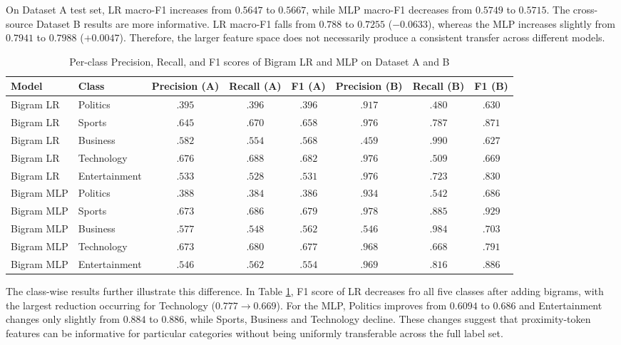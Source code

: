 \documentclass[letterpaper,conference,compsoc,onecolumn]{IEEEtran}
\begin{document}
On Dataset A test set, LR macro-F1 increases from $0.5647$ to $0.5667$, while MLP macro-F1 decreases from $0.5749$ to $0.5715$. The cross-source Dataset B results are more informative. LR macro-F1 falls from $0.788$ to $0.7255$ ($-0.0633$), whereas the MLP increases slightly from $0.7941$ to $0.7988$ ($+0.0047$). Therefore, the larger feature space does not necessarily produce a consistent transfer across different models.

\begin{table}[h]
  \centering
  \caption{Per-class Precision, Recall, and F1 scores of Bigram LR and MLP on Dataset A and B}
  \label{table:lr_mlp_extension_perclass_performance}
  \begin{tabular}{llcccccc}
    \hline
    \textbf{Model} & \textbf{Class} & \textbf{Precision (A)} & \textbf{Recall (A)} & \textbf{F1 (A)} & \textbf{Precision (B)} & \textbf{Recall (B)} & \textbf{F1 (B)} \\
    \hline
    Bigram LR & Politics & $.395$ & $.396$ & $.396$ & $.917$ & $.480$ & $.630$\\
    Bigram LR & Sports & $.645$ & $.670$ & $.658$ & $.976$ & $.787$ & $.871$\\
    Bigram LR & Business & $.582$ & $.554$ & $.568$ & $.459$ & $.990$ & $.627$\\
    Bigram LR & Technology & $.676$ & $.688$ & $.682$ & $.976$ & $.509$ & $.669$\\
    Bigram LR & Entertainment & $.533$ & $.528$ & $.531$ & $.976$ & $.723$ & $.830$\\
    Bigram MLP & Politics & $.388$ & $.384$ & $.386$ & $.934$ & $.542$ & $.686$\\
    Bigram MLP & Sports & $.673$ & $.686$ & $.679$ & $.978$ & $.885$ & $.929$\\
    Bigram MLP & Business & $.577$ & $.548$ & $.562$ & $.546$ & $.984$ & $.703$\\
    Bigram MLP & Technology & $.673$ & $.680$ & $.677$ & $.968$ & $.668$ & $.791$\\
    Bigram MLP & Entertainment & $.546$ & $.562$ & $.554$ & $.969$ & $.816$ & $.886$\\
    \hline  
  \end{tabular}
\end{table}

The class-wise results further illustrate this difference. In Table \ref{table:lr_mlp_extension_perclass_performance}, F1 score of LR decreases fro all five classes after adding bigrams, with the largest reduction occurring for Technology ($0.777 \to 0.669$). For the MLP, Politics improves from $0.6094$ to $0.686$ and Entertainment changes only slightly from $0.884$ to $0.886$, while Sports, Business and Technology decline. These changes suggest that proximity-token features can be informative for particular categories without being uniformly transferable across the full label set.
\end{document}
